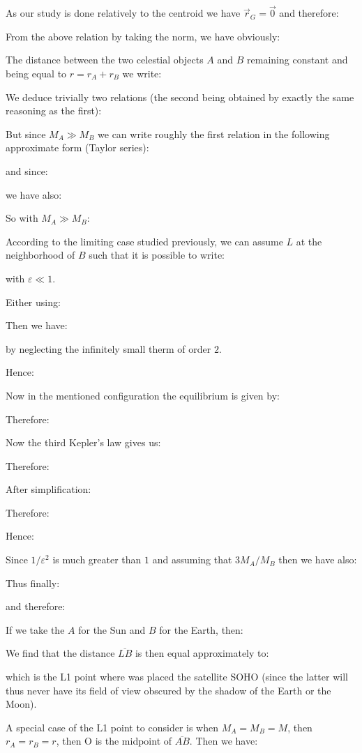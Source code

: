 	As our study is done relatively to the centroid we have $\vec{r}_G=\vec{0}$ and therefore:
	
	From the above relation by taking the norm, we have obviously:
	
	The distance between the two celestial objects $A$ and $B$ remaining constant and being equal to $r=r_A+r_B$ we write:
	
	We deduce trivially two relations (the second being obtained by exactly the same reasoning as the first):
	
	But since $M_A \gg M_B$ we can write roughly the first relation in the following approximate form (Taylor series):
	
	and since:
	
	we have also:
	
	So with $M_A\gg M_B$:
	
	According to the limiting case studied previously, we can assume $L$ at the neighborhood of $B$ such that it is possible to write:
	
	with $\varepsilon\ll 1$.
	
	Either using:
	
	Then we have:
	
	by neglecting the infinitely small therm of order $2$.

	Hence:
	
	Now in the mentioned  configuration the equilibrium is given by:
	
	Therefore:
	

	Now the third Kepler's law  gives us:
	
	Therefore:
	
	After simplification:
	
	Therefore:
	
	Hence:
	
	Since $1/\varepsilon^2$ is much greater than $1$ and assuming that $3M_A/M_B$ then we have also:
	
	Thus finally:
	
	and therefore:
	
	If we take the $A$ for the Sun and $B$ for the Earth, then:
	
	We find that the distance $\overline{LB}$ is then equal approximately to:
	
	which is the L1 point where was placed the satellite SOHO (since the latter will thus never  have its field of view obscured by the shadow of the Earth or the Moon).

	A special case of the L1 point to consider is when $M_A=M_B=M$, then $r_A=r_B=r$, then O is the midpoint of $\overline{AB}$. Then we have:
	

